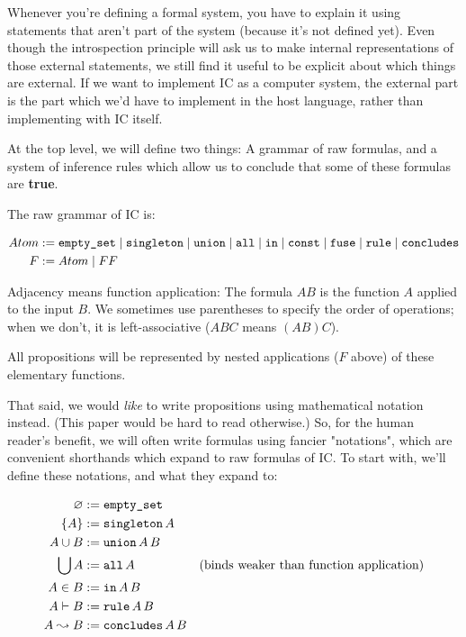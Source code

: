 \documentclass{article}
\begin{document}
  Whenever you're defining a formal system, you have to explain it using statements that aren't part of the system (because it's not defined yet).
  Even though the introspection principle will ask us to make internal representations of those external statements, we still find it useful to be explicit about which things are external.
  If we want to implement IC as a computer system, the external part is the part which we'd have to implement in the host language, rather than implementing with IC itself.
  
  At the top level, we will define two things: A grammar of raw formulas, and a system of inference rules which allow us to conclude that some of these formulas are \textbf{true}.
  
  The raw grammar of IC is:
  
  \begin{align*}
    Atom &:= \operatorname{\texttt{empty\_set}} \mid \operatorname{\texttt{singleton}} \mid \operatorname{\texttt{union}} \mid \operatorname{\texttt{all}} \mid \operatorname{\texttt{in}} \mid \operatorname{\texttt{const}} \mid \operatorname{\texttt{fuse}} \mid \operatorname{\texttt{rule}} \mid \operatorname{\texttt{concludes}}\\
    F &:= Atom \mid FF \\
  \end{align*}
  
  Adjacency means function application: The formula $AB$ is the function $A$ applied to the input $B$. We sometimes use parentheses to specify the order of operations; when we don't, it is left-associative ($ABC$ means $(AB)C$).
  
  All propositions will be represented by nested applications ($F$ above) of these elementary functions.
  
  That said, we would \emph{like} to write propositions using mathematical notation instead.
  (This paper would be hard to read otherwise.)
  So, for the human reader's benefit, we will often write formulas using fancier "notations", which are convenient shorthands which expand to raw formulas of IC.
  To start with, we'll define these notations, and what they expand to:
  
  \begin{align*}
    \varnothing &:= \operatorname{\texttt{empty\_set}}\\
    \{A\} &:= \operatorname{\texttt{singleton}} A\\
    A \cup B &:= \operatorname{\texttt{union}} A\, B\\
    \bigcup A &:= \operatorname{\texttt{all}} A & (\text{binds weaker than function application})\\
    A \in B &:= \operatorname{\texttt{in}} A\, B\\
    A \vdash B &:= \operatorname{\texttt{rule}} A\, B\\
    A \leadsto B &:= \operatorname{\texttt{concludes}} A\, B\\
  \end{align*}
  
\end{document}
